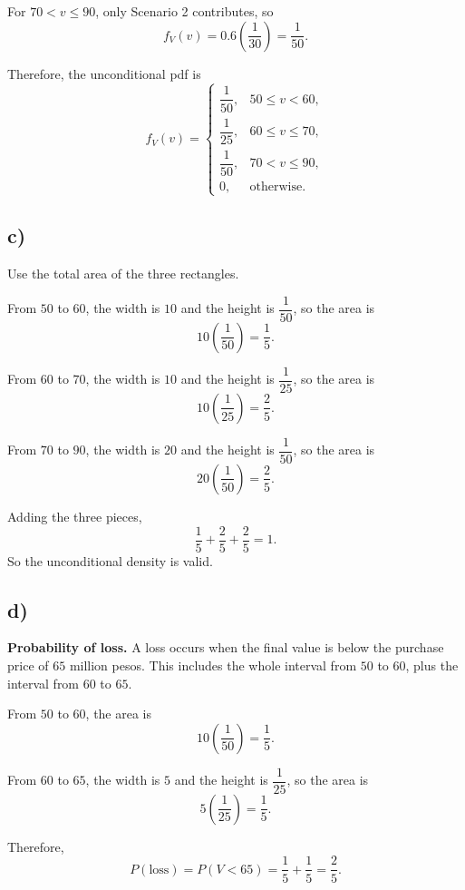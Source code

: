 	For $70<v\le 90$, only Scenario 2 contributes, so
	\[
	f_V(v)=0.6\left(\frac{1}{30}\right)=\frac{1}{50}.
	\]
	
	Therefore, the unconditional pdf is
	\[
	f_V(v)=
	\begin{cases}
		\dfrac{1}{50}, & 50\le v<60,\\[6pt]
		\dfrac{1}{25}, & 60\le v\le 70,\\[6pt]
		\dfrac{1}{50}, & 70<v\le 90,\\[6pt]
		0, & \text{otherwise.}
	\end{cases}
	\]
	
	\subsection*{c)}
	Use the total area of the three rectangles.
	
	From $50$ to $60$, the width is $10$ and the height is $\dfrac{1}{50}$, so the area is
	\[
	10\left(\frac{1}{50}\right)=\frac{1}{5}.
	\]
	
	From $60$ to $70$, the width is $10$ and the height is $\dfrac{1}{25}$, so the area is
	\[
	10\left(\frac{1}{25}\right)=\frac{2}{5}.
	\]
	
	From $70$ to $90$, the width is $20$ and the height is $\dfrac{1}{50}$, so the area is
	\[
	20\left(\frac{1}{50}\right)=\frac{2}{5}.
	\]
	
	Adding the three pieces,
	\[
	\frac{1}{5}+\frac{2}{5}+\frac{2}{5}=1.
	\]
	So the unconditional density is valid.
	
	\subsection*{d)}
	\textbf{Probability of loss.} A loss occurs when the final value is below the purchase price of $65$ million pesos. This includes the whole interval from $50$ to $60$, plus the interval from $60$ to $65$.
	
	From $50$ to $60$, the area is
	\[
	10\left(\frac{1}{50}\right)=\frac{1}{5}.
	\]
	
	From $60$ to $65$, the width is $5$ and the height is $\dfrac{1}{25}$, so the area is
	\[
	5\left(\frac{1}{25}\right)=\frac{1}{5}.
	\]
	
	Therefore,
	\[
	P(\text{loss})=P(V<65)=\frac{1}{5}+\frac{1}{5}=\frac{2}{5}.
	\]
	
